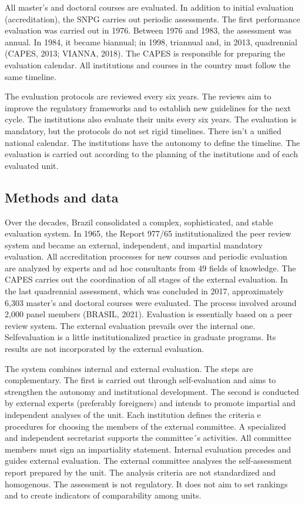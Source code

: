 All master’s and doctoral courses are evaluated. In addition to initial evaluation (accreditation), the SNPG carries out periodic assessments. The first performance evaluation was carried out in 1976. Between 1976 and 1983, the assessment was annual. In 1984, it became biannual; in 1998, triannual and, in 2013, quadrennial (CAPES, 2013; VIANNA, 2018). The CAPES is responsible for preparing the evaluation calendar. All institutions and courses in the country must follow the same timeline.   

The evaluation protocols are reviewed every six years. The reviews aim to improve the regulatory frameworks and to establish new guidelines for the next cycle. The institutions also evaluate their units every six years. The evaluation is mandatory, but the protocols do not set rigid timelines. There isn’t a unified national calendar. The institutions have the autonomy to define the timeline. The evaluation is carried out according to the planning of the institutions and of each evaluated unit.      

\subsection{Methods and data}
\label{subsec:comp_evaluation:methods}

Over the decades, Brazil consolidated a complex, sophisticated, and stable evaluation system. In 1965, the Report 977/65 institutionalized the peer review system and became an external, independent, and impartial mandatory evaluation. All accreditation processes for new courses and periodic evaluation are analyzed by experts and ad hoc consultants from 49 fields of knowledge. The CAPES carries out the coordination of all stages of the external evaluation. In the last quadrennial assessment, which was concluded in 2017, approximately 6,303 master’s and doctoral courses were evaluated. The process involved around 2,000 panel members (BRASIL, 2021). Evaluation is essentially based on a peer review system. The external evaluation prevails over the internal one. Selfevaluation is a little institutionalized practice in graduate programs. Its results are not incorporated by the external evaluation.            

The system combines internal and external evaluation. The steps are complementary. The first is carried out through self-evaluation and aims to strengthen the autonomy and institutional development. The second is conducted by external experts (preferably foreigners) and intends to promote impartial and independent analyses of the unit. Each institution defines the criteria e procedures for choosing the members of the external committee. A specialized and independent secretariat supports the committee´s activities. All committee members must sign an impartiality statement. Internal evaluation precedes and guides external evaluation. The external committee analyses the self-assessment report prepared by the unit. The analysis criteria are not standardized and homogenous. The assessment is not regulatory. It does not aim to set rankings and to create indicators of comparability among units.  

